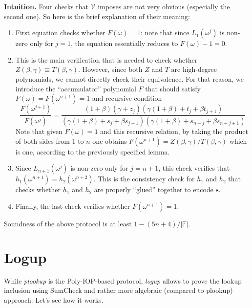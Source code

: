 \documentclass{lookup-template}
\begin{document}
\textbf{Intuition.} Four checks that $\mathcal{V}$ imposes are not very 
obvious (especially the second one). So here is the brief explanation of their meaning:
\begin{enumerate}
    \item First equation checks whether $F(\omega)=1$: note that since
    $L_1(\omega^j)$ is non-zero only for $j=1$, the equation essentially reduces
    to $F(\omega)-1=0$.
    \item This is the main verification that is needed to check whether
    $Z(\beta,\gamma) \equiv T(\beta,\gamma)$. However, since both $Z$ and $T$
    are high-degree polynomials, we cannot directly check their equivalence. For 
    that reason, we introduce the ``accumulator'' polynomial $F$ that should satisfy 
    $F(\omega) = F(\omega^{n+1}) = 1$ and recursive condition
    \begin{equation*}
        \frac{F(\omega^{j+1})}{F(\omega^j)} = \frac{(1+\beta)(\gamma+z_j)(\gamma(1+\beta)+t_j+\beta t_{j+1})}{(\gamma(1+\beta)+s_j+\beta s_{j+1})(\gamma(1+\beta) + s_{n+j} + \beta s_{n+j+1})}
    \end{equation*}
    Note that given $F(\omega)=1$ and this recursive relation, by taking the
    product of both sides from $1$ to $n$ one obtains
    $F(\omega^{n+1})=Z(\beta,\gamma)/T(\beta,\gamma)$ which is one, according to the
    previously specified lemma.
    \item Since $L_{n+1}(\omega^j)$ is non-zero only for $j=n+1$, this check
    verifies that $h_1(\omega^{n+1}) = h_2(\omega^{n+2})$. This is the
    consistency check for $h_1$ and $h_2$ that checks whether $h_1$ and $h_2$
    are properly ``glued'' together to encode $\boldsymbol{s}$.
    \item Finally, the last check verifies whether $F(\omega^{n+1})=1$.
\end{enumerate}

\begin{lemma}
    Soundness of the above protocol is at least $1-(5n+4)/|\mathbb{F}|$.
\end{lemma}

\section*{Logup}

While \textit{plookup} is the Poly-IOP-based protocol, \textit{logup} allows to
prove the lookup inclusion using SumCheck and rather more algebraic (compared to
plookup) approach. Let's see how it works.
\end{document}
